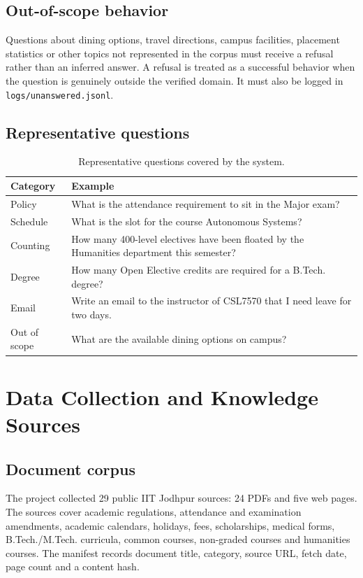 \documentclass[11pt,a4paper]{article}
\begin{document}
\subsection{Out-of-scope behavior}
Questions about dining options, travel directions, campus facilities, placement statistics or other topics not represented in the corpus must receive a refusal rather than an inferred answer. A refusal is treated as a successful behavior when the question is genuinely outside the verified domain. It must also be logged in \texttt{logs/unanswered.jsonl}.

\subsection{Representative questions}
\begin{table}[H]
\centering
\caption{Representative questions covered by the system.}
\label{tab:representative}
\small
\begin{tabularx}{\textwidth}{>{\raggedright\arraybackslash}p{}X}
\toprule
\textbf{Category} & \textbf{Example}\\
\midrule
Policy & What is the attendance requirement to sit in the Major exam?\\
Schedule & What is the slot for the course Autonomous Systems?\\
Counting & How many 400-level electives have been floated by the Humanities department this semester?\\
Degree & How many Open Elective credits are required for a B.Tech. degree?\\
Email & Write an email to the instructor of CSL7570 that I need leave for two days.\\
Out of scope & What are the available dining options on campus?\\
\bottomrule
\end{tabularx}
\end{table}

\section{Data Collection and Knowledge Sources}
\label{sec:data}

\subsection{Document corpus}
The project collected 29 public IIT Jodhpur sources: 24 PDFs and five web pages. The sources cover academic regulations, attendance and examination amendments, academic calendars, holidays, fees, scholarships, medical forms, B.Tech./M.Tech. curricula, common courses, non-graded courses and humanities courses. The manifest records document title, category, source URL, fetch date, page count and a content hash.
\end{document}
